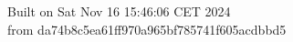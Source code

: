 {\noindent Built on Sat Nov 16 15:46:06 CET 2024} \\ 
 {\noindent from da74b8c5ea61ff970a965bf785741f605acdbbd5}
